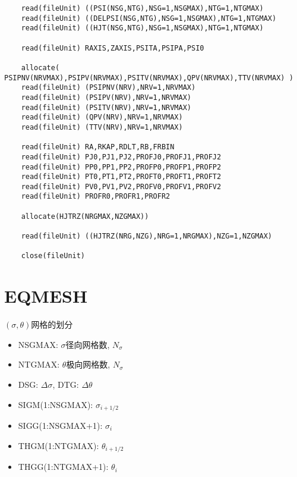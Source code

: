 \documentclass[11pt,a4paper]{article}
\begin{document}
\begin{lstlisting}
	read(fileUnit) ((PSI(NSG,NTG),NSG=1,NSGMAX),NTG=1,NTGMAX)
	read(fileUnit) ((DELPSI(NSG,NTG),NSG=1,NSGMAX),NTG=1,NTGMAX)
	read(fileUnit) ((HJT(NSG,NTG),NSG=1,NSGMAX),NTG=1,NTGMAX)
	
	read(fileUnit) RAXIS,ZAXIS,PSITA,PSIPA,PSI0
	
	allocate( PSIPNV(NRVMAX),PSIPV(NRVMAX),PSITV(NRVMAX),QPV(NRVMAX),TTV(NRVMAX) )
	read(fileUnit) (PSIPNV(NRV),NRV=1,NRVMAX)
	read(fileUnit) (PSIPV(NRV),NRV=1,NRVMAX)
	read(fileUnit) (PSITV(NRV),NRV=1,NRVMAX)
	read(fileUnit) (QPV(NRV),NRV=1,NRVMAX)
	read(fileUnit) (TTV(NRV),NRV=1,NRVMAX)
	
	read(fileUnit) RA,RKAP,RDLT,RB,FRBIN
	read(fileUnit) PJ0,PJ1,PJ2,PROFJ0,PROFJ1,PROFJ2
	read(fileUnit) PP0,PP1,PP2,PROFP0,PROFP1,PROFP2
	read(fileUnit) PT0,PT1,PT2,PROFT0,PROFT1,PROFT2
	read(fileUnit) PV0,PV1,PV2,PROFV0,PROFV1,PROFV2
	read(fileUnit) PROFR0,PROFR1,PROFR2
	
	allocate(HJTRZ(NRGMAX,NZGMAX))
	
	read(fileUnit) ((HJTRZ(NRG,NZG),NRG=1,NRGMAX),NZG=1,NZGMAX)
	
	close(fileUnit)
	\end{lstlisting}
	
	
\section{EQMESH}
	$(\sigma,\theta)$网格的划分
	\begin{itemize}
		\item{NSGMAX}: $\sigma$径向网格数, $N_\sigma$ 
		\item{NTGMAX}: $\theta$极向网格数, $N_\sigma$
		\item DSG: $\Delta{\sigma}$, DTG: $\Delta{\theta}$  
		\item SIGM(1:NSGMAX): $\sigma_{i+1/2}$
		\item SIGG(1:NSGMAX+1): $\sigma_i$
		\item THGM(1:NTGMAX): $\theta_{i+1/2}$
		\item THGG(1:NTGMAX+1): $\theta_i$
	\end{itemize}
	
	
\end{document}
